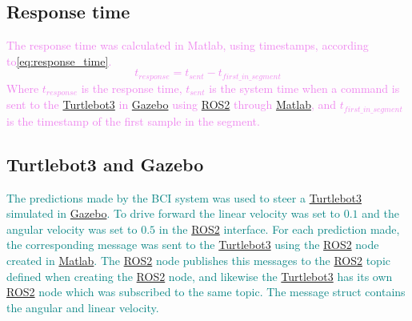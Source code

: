 
\subsection{Response time}
\textcolor{violet}{The response time was calculated in Matlab, using timestamps, according to\:\eqref{eq:response_time}.
	\begin{dmath}
		\label{eq:response_time}
		t_{response} = t_{sent} - t_{first\_in\_segment}
	\end{dmath}
	Where $t_{response}$ is the response time, $t_{sent}$ is the system time when a command is sent to the \href{https://github.com/ROBOTIS-GIT/turtlebot3}{Turtlebot3} in \href{https://gazebosim.org/home}{Gazebo} using \href{https://docs.ros.org/en/humble/index.html}{ROS2} through \href{https://se.mathworks.com/products/matlab.html}{Matlab}, and $t_{first\_in\_segment}$ is the timestamp of the first sample in the segment.}


\subsection{Turtlebot3 and Gazebo}
\textcolor{teal}{The predictions made by the BCI system was used to steer a \href{https://github.com/ROBOTIS-GIT/turtlebot3}{Turtlebot3} simulated in \href{https://gazebosim.org/home}{Gazebo}. To drive forward the linear velocity was set to $ 0.1 $ and the angular velocity was set to $ 0.5 $ in the \href{https://docs.ros.org/en/humble/index.html}{ROS2} interface. For each prediction made, the corresponding message was sent to the \href{https://github.com/ROBOTIS-GIT/turtlebot3}{Turtlebot3} using the \href{https://docs.ros.org/en/humble/index.html}{ROS2} node created in \href{https://se.mathworks.com/products/matlab.html}{Matlab}. The \href{https://docs.ros.org/en/humble/index.html}{ROS2} node publishes this messages to the \href{https://docs.ros.org/en/humble/index.html}{ROS2} topic defined when creating the \href{https://docs.ros.org/en/humble/index.html}{ROS2} node, and likewise the \href{https://github.com/ROBOTIS-GIT/turtlebot3}{Turtlebot3} has its own \href{https://docs.ros.org/en/humble/index.html}{ROS2} node which was subscribed to the same topic. The message struct contains the angular and linear velocity.}


